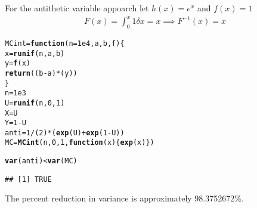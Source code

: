 \documentclass{article}\usepackage[]{graphicx}\usepackage[]{color}
\makeatletter
\newcommand{\hlnum}[1]{\textcolor[rgb]{0.686,0.059,0.569}{#1}}%
\newcommand{\hlopt}[1]{\textcolor[rgb]{0,0,0}{#1}}%
\newcommand{\hlstd}[1]{\textcolor[rgb]{0.345,0.345,0.345}{#1}}%
\newcommand{\hlkwa}[1]{\textcolor[rgb]{0.161,0.373,0.58}{\textbf{#1}}}%
\newcommand{\hlkwb}[1]{\textcolor[rgb]{0.69,0.353,0.396}{#1}}%
\newcommand{\hlkwc}[1]{\textcolor[rgb]{0.333,0.667,0.333}{#1}}%
\newcommand{\hlkwd}[1]{\textcolor[rgb]{0.737,0.353,0.396}{\textbf{#1}}}%
\newenvironment{kframe}{%
 \def\at@end@of@kframe{}%
 \ifinner\ifhmode%
  \def\at@end@of@kframe{\end{minipage}}%
  \begin{minipage}{\columnwidth}%
 \fi\fi%
 \def\FrameCommand##1{\hskip\@totalleftmargin \hskip-\fboxsep
 \colorbox{shadecolor}{##1}\hskip-\fboxsep
     \hskip-\linewidth \hskip-\@totalleftmargin \hskip\columnwidth}%
 \MakeFramed {\advance\hsize-\width
   \@totalleftmargin\z@ \linewidth\hsize
   \@setminipage}}%
 {\par\unskip\endMakeFramed%
 \at@end@of@kframe}
\newenvironment{knitrout}{}{} %
\makeatother
\begin{document}
For the antithetic variable appoarch let $h(x) = e^{x}$ and $f(x) = 1$
\begin{equation}
  \begin{split}
  F(x) = \int_{0}^{x} 1 \delta x = x \implies F^{-1}(x) =x
  \end{split}
\end{equation}
\begin{knitrout}
\color{fgcolor}\begin{kframe}
\begin{alltt}
\hlstd{MCint} \hlkwb{=} \hlkwa{function}\hlstd{(}\hlkwc{n} \hlstd{=}\hlnum{1e4}\hlstd{,} \hlkwc{a}\hlstd{,} \hlkwc{b}\hlstd{,} \hlkwc{f}\hlstd{)\{}
  \hlstd{x} \hlkwb{=} \hlkwd{runif}\hlstd{(n, a, b)}
  \hlstd{y} \hlkwb{=} \hlkwd{f}\hlstd{(x)}
  \hlkwd{return}\hlstd{((b}\hlopt{-}\hlstd{a)}\hlopt{*}\hlstd{(y))}
\hlstd{\}}
\hlstd{n} \hlkwb{=} \hlnum{1e3}
\hlstd{U} \hlkwb{=} \hlkwd{runif}\hlstd{(n,} \hlnum{0}\hlstd{,} \hlnum{1}\hlstd{)}
\hlstd{X} \hlkwb{=} \hlstd{U}
\hlstd{Y} \hlkwb{=} \hlnum{1} \hlopt{-} \hlstd{U}
\hlstd{anti} \hlkwb{=} \hlnum{1}\hlopt{/}\hlstd{(}\hlnum{2}\hlstd{)}\hlopt{*}\hlstd{(}\hlkwd{exp}\hlstd{(U)}\hlopt{+}\hlkwd{exp}\hlstd{(}\hlnum{1}\hlopt{-}\hlstd{U))}
\hlstd{MC} \hlkwb{=} \hlkwd{MCint}\hlstd{(n,}\hlnum{0}\hlstd{,}\hlnum{1}\hlstd{,} \hlkwa{function}\hlstd{(}\hlkwc{x}\hlstd{)\{}\hlkwd{exp}\hlstd{(x)\})}

\hlkwd{var}\hlstd{(anti)} \hlopt{<} \hlkwd{var}\hlstd{(MC)}
\end{alltt}
\begin{verbatim}
## [1] TRUE
\end{verbatim}
\end{kframe}
\end{knitrout}
The percent reduction in variance is approximately 98.3752672\%.
\end{document}
